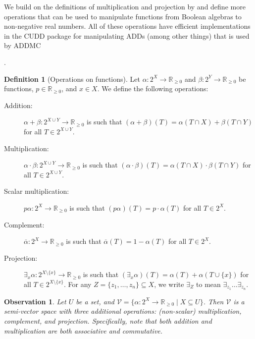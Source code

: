 \documentclass[letterpaper]{article} %
\newtheorem{observation}{Observation}
\theoremstyle{definition}
\newtheorem{definition}{Definition}
\theoremstyle{remark}
\begin{document}
We build on the definitions of multiplication and projection by
\citet{DBLP:conf/aaai/DudekPV20} and define more operations that can be used to
manipulate functions from Boolean algebras to non-negative real numbers. All of
these operations have efficient implementations in the CUDD
\cite{somenzi1998cudd} package for manipulating ADDs (among other things) that
is used by ADDMC {\cite{DBLP:conf/aaai/DudekPV20}.

\begin{definition}[Operations on functions]
  Let $\alpha\colon 2^X \to \mathbb{R}_{\ge 0}$ and $\beta\colon 2^Y \to
  \mathbb{R}_{\ge 0}$ be functions, $p \in \mathbb{R}_{\ge 0}$, and $x \in X$.
  We define the following operations:
  \begin{description}
  \item[Addition:] $\alpha + \beta\colon 2^{X \cup Y} \to \mathbb{R}_{\ge 0}$ is
    such that $(\alpha + \beta)(T) = \alpha(T \cap X) + \beta(T \cap Y)$ for all
    $T \in 2^{X \cup Y}$.
  \item[Multiplication:] $\alpha \cdot \beta\colon 2^{X \cup Y} \to
    \mathbb{R}_{\ge 0}$ is such that $(\alpha \cdot \beta)(T) = \alpha(T \cap X)
    \cdot \beta(T \cap Y)$ for all $T \in 2^{X \cup Y}$.
  \item[Scalar multiplication:] $p\alpha\colon 2^X \to \mathbb{R}_{\ge 0}$ is
    such that $(p\alpha)(T) = p \cdot \alpha(T)$ for all $T \in 2^X$.
  \item[Complement:] $\overline{\alpha}\colon 2^X \to \mathbb{R}_{\ge 0}$ is
    such that $\overline{\alpha}(T) = 1 - \alpha(T)$ for all $T \in 2^X$.
  \item[Projection:] $\exists_x\alpha\colon 2^{X \setminus \{ x \}} \to
    \mathbb{R}_{\ge 0}$ is such that $(\exists_x\alpha)(T) = \alpha(T) +
    \alpha(T \cup \{ x \})$ for all $T \in 2^{X \setminus \{x \}}$. For any $Z =
    \{ z_1, \dots, z_n \} \subseteq X$, we write $\exists_Z$ to mean
    $\exists_{z_1}\dots\exists_{z_n}$.
  \end{description}
\end{definition}

\begin{observation}
  Let $U$ be a set, and $\mathcal{V} = \{ \alpha\colon 2^X \to \mathbb{R}_{\ge 0}
  \mid X \subseteq U \}$. Then $\mathcal{V}$ is a semi-vector space with three
  additional operations: (non-scalar) multiplication, complement, and projection.
  Specifically, note that both addition and multiplication are both associative
  and commutative.
\end{observation}

}
\end{document}
